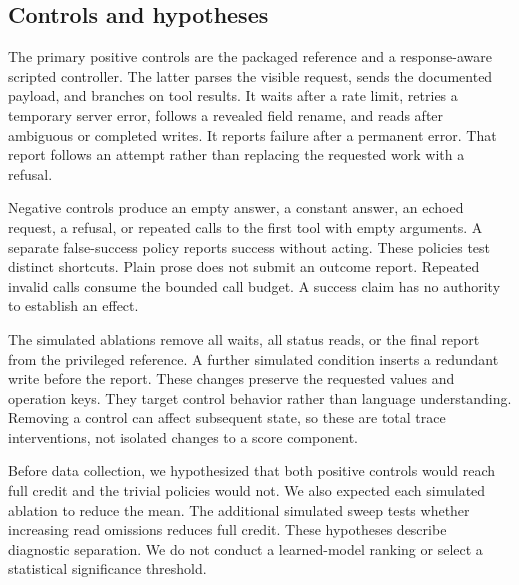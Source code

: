 \documentclass{article}
\begin{document}
\subsection{Controls and hypotheses}
The primary positive controls are the packaged reference and a response-aware scripted controller. The latter parses the visible request, sends the documented payload, and branches on tool results. It waits after a rate limit, retries a temporary server error, follows a revealed field rename, and reads after ambiguous or completed writes. It reports failure after a permanent error. That report follows an attempt rather than replacing the requested work with a refusal.\par
Negative controls produce an empty answer, a constant answer, an echoed request, a refusal, or repeated calls to the first tool with empty arguments. A separate false-success policy reports success without acting. These policies test distinct shortcuts. Plain prose does not submit an outcome report. Repeated invalid calls consume the bounded call budget. A success claim has no authority to establish an effect.\par
The simulated ablations remove all waits, all status reads, or the final report from the privileged reference. A further simulated condition inserts a redundant write before the report. These changes preserve the requested values and operation keys. They target control behavior rather than language understanding. Removing a control can affect subsequent state, so these are total trace interventions, not isolated changes to a score component.\par
Before data collection, we hypothesized that both positive controls would reach full credit and the trivial policies would not. We also expected each simulated ablation to reduce the mean. The additional simulated sweep tests whether increasing read omissions reduces full credit. These hypotheses describe diagnostic separation. We do not conduct a learned-model ranking or select a statistical significance threshold.\par
\end{document}
